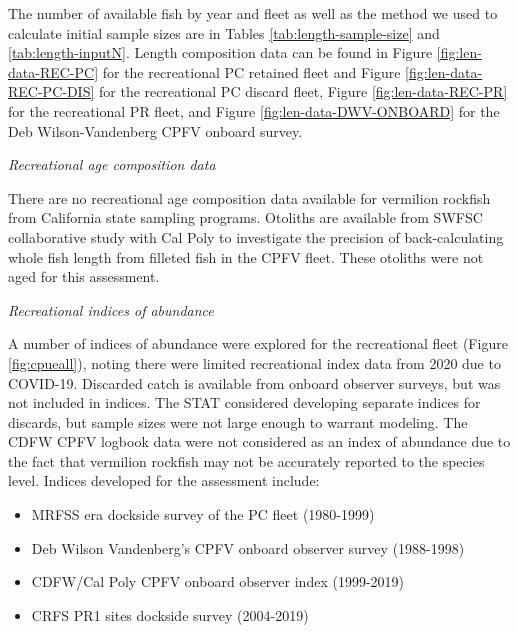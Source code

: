 \documentclass[11pt,
  english,
]{article}
\begin{document}
\tagstructend

The number of available fish by year and fleet as well as the method we used to calculate initial sample sizes are in Tables \ref{tab:length-sample-size} and \ref{tab:length-inputN}. Length composition data can be found in Figure \ref{fig:len-data-REC-PC} for the recreational PC retained fleet and Figure \ref{fig:len-data-REC-PC-DIS} for the recreational PC discard fleet, Figure \ref{fig:len-data-REC-PR} for the recreational PR fleet, and Figure \ref{fig:len-data-DWV-ONBOARD} for the Deb Wilson-Vandenberg CPFV onboard survey.

\emph{Recreational age composition data}

There are no recreational age composition data available for vermilion rockfish from California state sampling programs. Otoliths are available from SWFSC collaborative study with Cal Poly to investigate the precision of back-calculating whole fish length from filleted fish in the CPFV fleet. These otoliths were not aged for this assessment.

\emph{Recreational indices of abundance}

A number of indices of abundance were explored for the recreational fleet (Figure \ref{fig:cpueall}), noting there were limited recreational index data from 2020 due to COVID-19. Discarded catch is available from onboard observer surveys, but was not included in indices. The STAT considered developing separate indices for discards, but sample sizes were not large enough to warrant modeling. The CDFW CPFV logbook data were not considered as an index of abundance due to the fact that vermilion rockfish may not be accurately reported to the species level. Indices developed for the assessment include:


\begin{itemize}
\item

  MRFSS era dockside survey of the PC fleet (1980-1999)

  \tagmcend\tagstructend\tagstructend
\item

  Deb Wilson Vandenberg's CPFV onboard observer survey (1988-1998)

  \tagmcend\tagstructend\tagstructend
\item

  CDFW/Cal Poly CPFV onboard observer index (1999-2019)

  \tagmcend\tagstructend\tagstructend
\item

  CRFS PR1 sites dockside survey (2004-2019)

  \tagmcend\tagstructend\tagstructend
\end{itemize}
\end{document}
